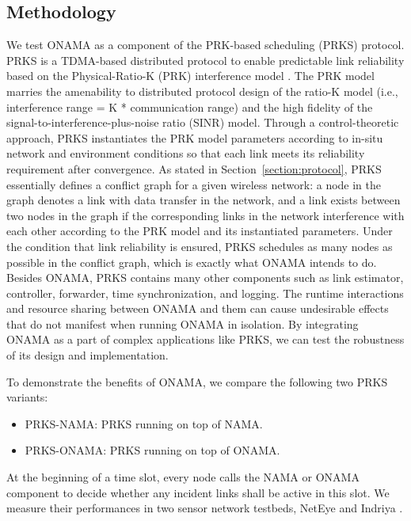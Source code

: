 \documentclass[conference]{IEEEtran}
\begin{document}
\subsection{Methodology}




We test ONAMA as a component of the PRK-based scheduling (PRKS) protocol. PRKS \cite{prks:zhang:tr} is a TDMA-based distributed protocol to enable predictable link reliability based on the Physical-Ratio-K (PRK) interference model \cite{prk:zhang:secon10}. The PRK model marries the amenability to distributed protocol design of the ratio-K model (i.e., interference range = K * communication range) and the high fidelity of the signal-to-interference-plus-noise ratio (SINR) model. Through a control-theoretic approach, PRKS instantiates the PRK model parameters according to in-situ network and environment conditions so that each link meets its reliability requirement after convergence. As stated in Section~\ref{section:protocol}, PRKS essentially defines a conflict graph for a given wireless network: a node in the graph denotes a link with data transfer in the network, and a link exists between two nodes in the graph if the corresponding links in the network interference with each other according to the PRK model and its instantiated parameters. Under the condition that link reliability is ensured, PRKS schedules as many nodes as possible in the conflict graph, which is exactly what ONAMA intends to do. Besides ONAMA, PRKS contains many other components such as link estimator, controller, forwarder, time synchronization, and logging. The runtime interactions and resource sharing between ONAMA and them can cause undesirable effects that do not manifest when running ONAMA in isolation. By integrating ONAMA as a part of complex applications like PRKS, we can test the robustness of its design and implementation.

To demonstrate the benefits of ONAMA, we compare the following two PRKS variants:
\begin{itemize}
	\item	PRKS-NAMA: PRKS running on top of NAMA.
	\item	PRKS-ONAMA: PRKS running on top of ONAMA.
\end{itemize}
At the beginning of a time slot, every node calls the NAMA or ONAMA component to decide whether any incident links shall be active in this slot. We measure their performances in two sensor network testbeds, NetEye \cite{neteye} and Indriya \cite{indriya}. 
\end{document}
